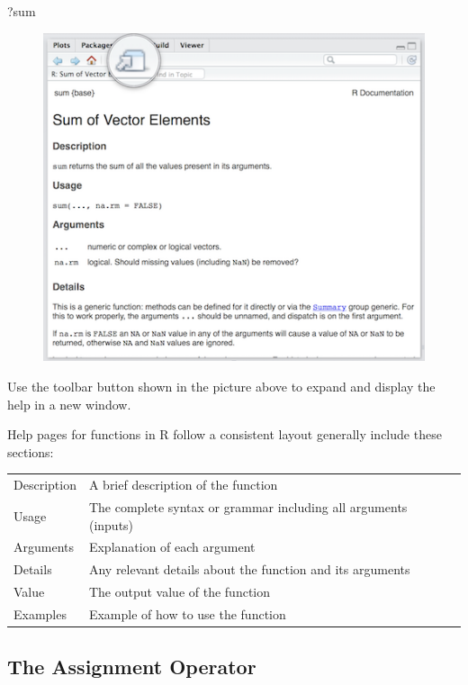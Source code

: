 \documentclass[]{book}
\newenvironment{Shaded}{\begin{snugshade}}{\end{snugshade}}
\newcommand{\NormalTok}[1]{#1}
\theoremstyle{definition}
\theoremstyle{definition}
\theoremstyle{definition}
\theoremstyle{remark}
\begin{document}
\begin{Shaded}
\begin{Highlighting}[]
\NormalTok{?sum}
\end{Highlighting}
\end{Shaded}

\begin{figure}
\centering
\includegraphics{./img/rstudio_help.png}
\caption{}
\end{figure}

Use the toolbar button shown in the picture above to expand and display
the help in a new window.

Help pages for functions in R follow a consistent layout generally
include these sections:

\begin{longtable}[]{@{}ll@{}}
\toprule
Description & A brief description of the function\tabularnewline
Usage & The complete syntax or grammar including all arguments
(inputs)\tabularnewline
Arguments & Explanation of each argument\tabularnewline
Details & Any relevant details about the function and its
arguments\tabularnewline
Value & The output value of the function\tabularnewline
Examples & Example of how to use the function\tabularnewline
\bottomrule
\end{longtable}

\subsection{The Assignment Operator}\label{the-assignment-operator}
\end{document}
